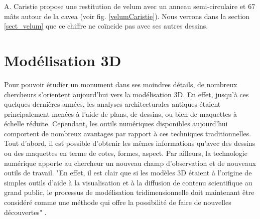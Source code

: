 		A. Caristie propose une restitution de \gls{velum} avec un anneau semi-circulaire et 67 mâts autour de la \gls{cavea} (voir fig. \ref{velumCaristie}). Nous verrons dans la section \ref{sect_velum} que ce chiffre ne coïncide pas avec ses autres dessins.
		














\chapter{Modélisation 3D}
		\minitoc
		\newpage
		
		Pour pouvoir étudier un monument dans ses moindres détails, de nombreux chercheurs s'orientent aujourd'hui vers la modélisation 3D. En effet, jusqu'à ces quel\-ques dernières années, les analyses architecturales antiques étaient principalement menées à l'aide de plans, de dessins, ou bien de maquettes à échelle réduite. Cependant, les outils numériques disponibles aujourd'hui comportent de nombreux avantages par rapport à ces techniques traditionnelles. Tout d'abord, il est possible d'obtenir les mêmes informations qu'avec des dessins ou des maquettes en terme de cotes, formes, aspect. Par ailleurs, la technologie numérique apporte au chercheur un nouveau champ d'observation et de nouveaux outils de travail. "En effet, il est clair que si les modèles 3D étaient à l’origine de simples outils d’aide à la visualisation et à la diffusion de contenu scientifique au grand public, le processus de modélisation tridimensionnelle doit maintenant être considéré comme une méthode qui offre la possibilité de faire de nouvelles découvertes" \cite[p. 246]{rocheleau}.
		
